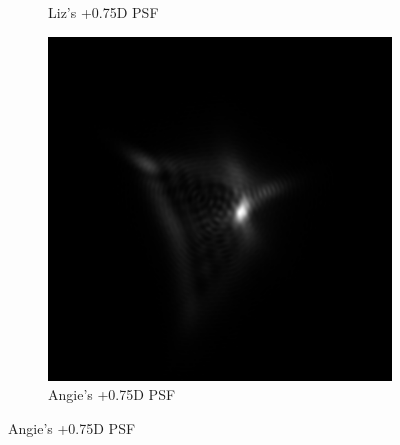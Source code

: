 \documentclass{article}
\begin{document}
\begin{figure}[H]
\begin{subfigure}{.3\textwidth}
  \caption{Liz's +0.75D PSF}
  \label{fig:liz075dpsf}
\end{subfigure}
\begin{subfigure}{.3\textwidth}
  \centering
  \includegraphics[width=1\linewidth]{Angie_R_0526_1_500_zer_075_5_PSF.png}
  \caption{Angie's +0.75D PSF}
  \label{fig:angie075dpsf}
\end{subfigure}

\medskip


\end{figure}
\end{document}
